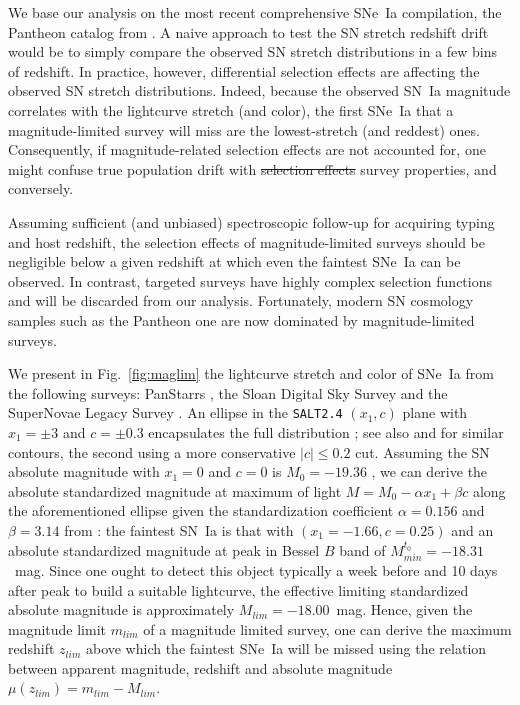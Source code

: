 \documentclass[]{aa} %
\newcommand{\yc}[1]{{\textcolor{BrickRed}{#1}}}
\begin{document}
We base our analysis on the \yc{most recent comprehensive} SNe~Ia compilation, the Pantheon catalog from
\cite{scolnic2018a}. A naive approach to test the SN stretch redshift drift
would be to simply compare the observed SN stretch distributions in a few bins
of redshift.  In practice, \yc{however}, \yc{differential} selection effects are affecting the observed SN
stretch distributions. Indeed, because the observed SN~Ia magnitude correlates
with the lightcurve stretch (and color), the first SNe~Ia that a
magnitude-limited survey will miss are the lowest-stretch (and reddest) ones.
Consequently, if \yc{magnitude-related} selection effects are not accounted for, one might confuse true
population drift with \yc{\sout{selection effects} survey properties}, and conversely.

Assuming sufficient (and unbiased) spectroscopic follow-up for acquiring typing
and host redshift, the selection effects of magnitude-limited surveys should be
negligible below a given redshift \yc{at which} even the faintest SNe~Ia can be observed.
In contrast, targeted surveys have highly complex selection functions and will
be discarded from our analysis. Fortunately, modern SN cosmology samples such as
the Pantheon \yc{one} are now dominated by magnitude-limited surveys.

We present in Fig.~\ref{fig:maglim} the lightcurve stretch and color of SNe~Ia from the following surveys: PanStarrs
\citep[PS1][]{rest2014}, the Sloan Digital Sky Survey
\citep[SDSS][]{frieman2008} and the SuperNovae Legacy Survey
\citep[SNLS][]{astier2006}. An ellipse in the \textsc{\texttt{SALT2.4}} $(x_1,
c)$ plane with $x_1 = \pm 3$ and $c = \pm 0.3$ encapsulates the full distribution
\citep{guy2007,betoule2014}; see also \citet{bazin2011} and \citet{campbell2013}
for similar contours, the second using a more conservative $|c| \leq 0.2$ cut.
Assuming the SN absolute magnitude with $x_1=0$ and $c=0$ is $M_0=-19.36$
\citep{kessler2009,scolnic2014}, we can derive the absolute standardized
magnitude at maximum of light $M = M_0 - \alpha x_1 + \beta c$ along the
aforementioned ellipse given the standardization coefficient $\alpha=0.156$ and
$\beta=3.14$ from \cite{scolnic2018a}: the faintest SN~Ia is that with
$(x_1=-1.66, c=0.25)$ and an absolute standardized magnitude at peak in Bessel $B$
band of $M^{t_0}_{min} = -18.31$~mag. Since one ought to detect this object
typically a week before and 10 days after peak to build a suitable lightcurve,
the \yc{effective} limiting standardized absolute magnitude is approximately
$M_{lim} = -18.00$~mag. Hence, given the magnitude limit $m_{lim}$ of a
magnitude limited survey, one can derive the maximum redshift $z_{lim}$ above
which the faintest SNe~Ia will be missed using the relation between apparent
magnitude, redshift and absolute magnitude $\mu(z_{lim}) = m_{lim} - M_{lim}$.
\end{document}
